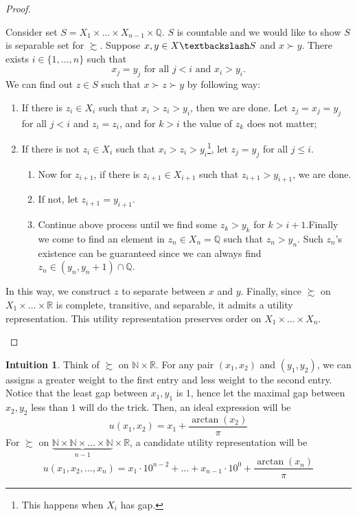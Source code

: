 \documentclass[a4paper, 12pt]{article}
\theoremstyle{definition}
\newtheorem{intuition}{Intuition}
\newcommand{\minus}{\textbackslash}
\begin{document}
\begin{proof}
\begin{enumerate}[label = (\roman*)]
Consider set $S=X_1\times\dots\times X_{n-1}\times\mathbb{Q}$. $S$ is countable and  we would like to show $S$ is separable set for $\succsim$. Suppose $x,y\in X\minus S$ and $x\succ y$. There exists $i\in\{1,\dots,n\}$ such that 
\[
x_j=y_j\text{ for all }j<i\text{ and }x_i>y_i.
\]
We can find out $z\in S$ such that $x\succ z\succ y$ by following way:
\begin{enumerate}
\item If there is $z_i\in X_i$ such that $x_i>z_i>y_i$, then we are done. Let $z_j=x_j=y_j$ for all $j<i$ and $z_i=z_i$, and for $k>i$ the value of $z_k$ does not matter;
\item If there is not $z_i\in X_i$ such that $x_i>z_i>y_i$\footnote{This happens when $X_i$ has gap.}, let $z_j=y_j$ for all $j\leq i$. 
\begin{enumerate}
\item Now for $z_{i+1}$, if there is $z_{i+1}\in X_{i+1}$ such that $z_{i+1}>y_{i+1}$, we are done. 
\item If not, let $z_{i+1}=y_{i+1}$.
\item Continue above process until we find some $z_{k}>y_k$ for $k> i+1$.Finally we come to find an element in $z_n\in X_n=\mathbb{Q}$ such that $z_n>y_n$. Such $z_n$'s existence can be guaranteed since we can always find $z_n\in (y_n,y_n+1)\cap\mathbb{Q}$.
\end{enumerate}
\end{enumerate}
In this way, we construct $z$ to separate between $x$ and $y$. Finally, since $\succsim$ on $X_1\times\dots\times\mathbb{R}$ is complete, transitive, and separable, it admits a utility representation. This utility representation preserves order on $X_1\times\dots\times X_n$.
\end{enumerate}
\end{proof}

\begin{intuition}
Think of $\succsim$ on $\mathbb{N}\times\mathbb{R}$. For any pair $(x_1,x_2)$ and $(y_1,y_2)$, we can assigns a greater weight to the first entry and less weight to the second entry. Notice that the least gap between $x_1,y_1$ is $1$, hence let the maximal gap between $x_2,y_2$ less than $1$ will do the trick. Then, an ideal expression will be
\[
u(x_1,x_2)=x_1+\frac{\arctan(x_2)}{\pi}
\]
For $\succsim$ on $\underbrace{\mathbb{N}\times\mathbb{N}\times\dots\times\mathbb{N}}_{n-1}\times\mathbb{R}$, a candidate utility representation will be
\[
u(x_1,x_2,\dots,x_n)=x_1\cdot10^{n-2}+\dots+x_{n-1}\cdot 10^0+\frac{\arctan(x_n)}{\pi}
\]
\end{intuition}
\end{document}
